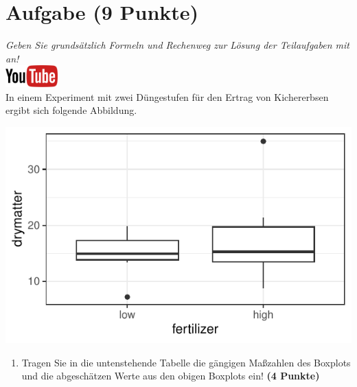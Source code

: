 \documentclass[a4paper, 10pt]{scrartcl}\usepackage[]{graphicx}\usepackage[]{xcolor}
\makeatletter
\def\maxwidth{ %
  \ifdim\Gin@nat@width>\linewidth
    \linewidth
  \else
    \Gin@nat@width
  \fi
}
\makeatother
\begin{document}
\section{Aufgabe \hfill (9 Punkte)}

\textit{Geben Sie grunds{\"a}tzlich Formeln und Rechenweg zur L{\"o}sung der
  Teilaufgaben mit an!} \\[1Ex]

\hfill\href{https://youtu.be/lXI_H6m26HE}{\includegraphics[width =
  2cm]{img/youtube}}\\[1Ex]


In einem Experiment mit zwei D{\"u}ngestufen f{\"u}r den Ertrag von Kichererbsen
ergibt sich folgende Abbildung. 





{\centering \includegraphics[width=\maxwidth]{img/boxplot-4b-1} 

}




\begin{enumerate}
\item Tragen Sie in die untenstehende Tabelle die g{\"a}ngigen Ma{\ss}zahlen des
  Boxplots und die abgesch{\"a}tzen Werte aus den obigen Boxplots ein! \textbf{(4 Punkte)}
\end{enumerate}
\end{document}
